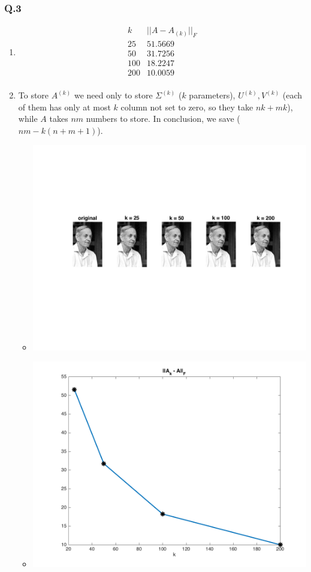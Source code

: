 \documentclass[12pt]{article}
\newcommand{\Q}[1]{\subsubsection*{Q.#1}}
\begin{document}
\Q{3}
\begin{enumerate}
\item
  \[
    \begin{array}{c|c}
      k & ||A - A_{(k)}||_F \\
      \hline
      25&51.5669\\
      50&31.7256\\
      100&18.2247\\
      200&10.0059\\
    \end{array}
  \]

 \item To store $A^{(k)}$ we need only to store $\Sigma^{(k)}$ ($k$ parameters), $U^{(k)}, V^{(k)}$ (each of them has only at most $k$ column not set to zero, so they take $nk + mk$), while $A$ takes $nm$ numbers to store.
   In conclusion, we save ($nm - k(n+m+1)$).
   \begin{itemize}
   \item \includegraphics[scale=.25]{compressed.png}

   \item \includegraphics[scale=.25]{diffnorm.png}



\end{itemize}
\end{enumerate}
\end{document}
